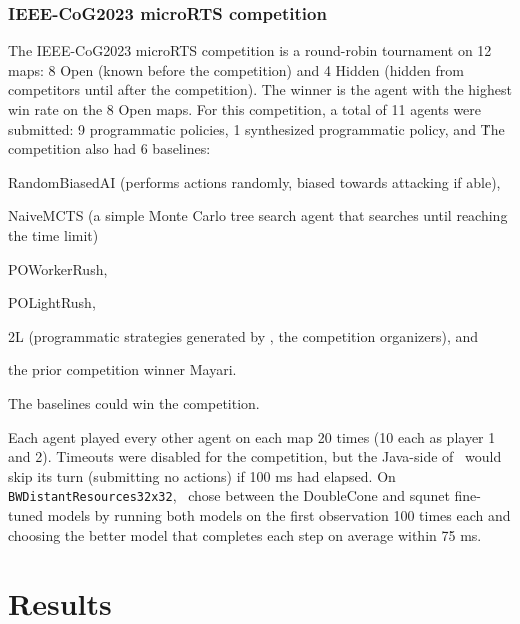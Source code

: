 \documentclass{article}
\begin{document}
\subsubsection{IEEE-CoG2023 microRTS competition}
The IEEE-CoG2023 microRTS competition is a round-robin tournament on 12 maps: 8 Open
(known before the competition) and 4 Hidden (hidden from competitors until after the
competition). The winner is the agent with the highest win rate on the 8 Open maps. For
this competition, a total of 11 agents were submitted: 9 programmatic policies, 1
synthesized programmatic policy, and \agentName\. The competition also had 6
baselines:
\begin{inparaenum}[(1)]
    \item RandomBiasedAI (performs actions randomly, biased towards attacking if able),
    \item NaiveMCTS (a simple Monte Carlo tree search agent that searches until reaching
    the time limit)
    \item POWorkerRush,
    \item POLightRush,
    \item 2L (programmatic strategies generated by \citet{Moraes2023ChoosingWY}, the
    competition organizers), and
    \item the prior competition winner Mayari.
\end{inparaenum}
The baselines could win the competition.

Each agent played every other agent on each map 20 times (10 each as player 1 and 2).
Timeouts were disabled for the competition, but the Java-side of \agentName\ would skip
its turn (submitting no actions) if 100 ms had elapsed. On
\texttt{BWDistantResources32x32}, \agentName\ chose between the DoubleCone and squnet
fine-tuned models by running both models on the first observation 100 times each and
choosing the better model that completes each step on average within 75 ms.

\section{Results}
\end{document}
